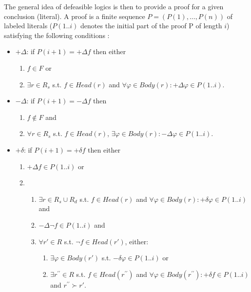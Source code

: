 \documentclass[version=3.21, pagesize, twoside=off, bibliography=totoc, DIV=calc, fontsize=12pt, a4paper, french, english]{scrartcl}
\begin{document}
The general idea of defeasible logics is then to provide a proof for a given conclusion (literal). A proof is a finite sequence $P = (P(1), \dots, P(n))$ of labeled literals ($P(1..i)$ denotes the initial part of the proof P of length $i$) satisfying the following conditions \cite{Billington1993}:

\begin{itemize}
\item $+\Delta$: if $P(i+1) = +\Delta f$ then either
  \begin{enumerate}
  \item $f \in F$ or
  \item $\exists r \in R_s$ s.t. $f \in Head(r)$ and $\forall \varphi \in Body(r): +\Delta \varphi \in P(1..i)$.
  \end{enumerate}

\item $-\Delta$: if $P(i+1) = -\Delta f$ then
  \begin{enumerate}
  \item $f \notin F$ and
  \item $\forall r \in R_s$ s.t. $f \in Head(r)$, $\exists \varphi \in Body(r): -\Delta \varphi \in P(1..i)$.
  \end{enumerate}

\item $+\delta$: if $P(i+1) = +\delta f$ then either
  \begin{enumerate}
  \item $+\Delta f \in P(1..i)$ or
  \item \vspace{-0.1cm}
    \begin{enumerate}
    \item $\exists r \in R_s \cup R_d$ s.t. $f \in Head(r)$ and $\forall \varphi \in Body(r): +\delta \varphi \in P(1..i)$ and
    \item $-\Delta \lnot f \in P(1..i)$ and
    \item $\forall r' \in R$ s.t. $\lnot f \in Head(r')$, either:
      \begin{enumerate}
      \item $\exists \varphi \in Body(r')$ s.t. $-\delta \varphi \in P(1..i)$ or
      \item $\exists r^{\prime\prime} \in R$ s.t. $f \in Head(r^{\prime\prime})$ and $\forall \varphi \in Body(r^{\prime\prime}): +\delta f \in P(1..i)$ and $r^{\prime\prime} \succ r'$.
      \end{enumerate}
    \end{enumerate}
  \end{enumerate}


\end{itemize}
\end{document}
